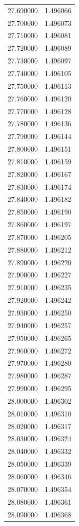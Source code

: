 \begin{tabular}{rr}
27.690000 & 1.496066 \\
27.700000 & 1.496073 \\
27.710000 & 1.496081 \\
27.720000 & 1.496089 \\
27.730000 & 1.496097 \\
27.740000 & 1.496105 \\
27.750000 & 1.496113 \\
27.760000 & 1.496120 \\
27.770000 & 1.496128 \\
27.780000 & 1.496136 \\
27.790000 & 1.496144 \\
27.800000 & 1.496151 \\
27.810000 & 1.496159 \\
27.820000 & 1.496167 \\
27.830000 & 1.496174 \\
27.840000 & 1.496182 \\
27.850000 & 1.496190 \\
27.860000 & 1.496197 \\
27.870000 & 1.496205 \\
27.880000 & 1.496212 \\
27.890000 & 1.496220 \\
27.900000 & 1.496227 \\
27.910000 & 1.496235 \\
27.920000 & 1.496242 \\
27.930000 & 1.496250 \\
27.940000 & 1.496257 \\
27.950000 & 1.496265 \\
27.960000 & 1.496272 \\
27.970000 & 1.496280 \\
27.980000 & 1.496287 \\
27.990000 & 1.496295 \\
28.000000 & 1.496302 \\
28.010000 & 1.496310 \\
28.020000 & 1.496317 \\
28.030000 & 1.496324 \\
28.040000 & 1.496332 \\
28.050000 & 1.496339 \\
28.060000 & 1.496346 \\
28.070000 & 1.496354 \\
28.080000 & 1.496361 \\
28.090000 & 1.496368 \\

\end{tabular}
